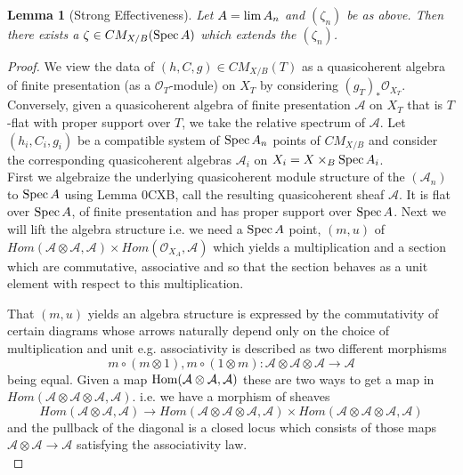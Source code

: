 \documentclass{stacks-project}
\theoremstyle{plain}
\newtheorem{lemma}[subsection]{Lemma}
\theoremstyle{definition}
\DeclareMathOperator{\Spec}{Spec}
\theoremstyle{remark}
\numberwithin{equation}{subsection}
\def\lim{\mathop{\rm lim}\nolimits}
\def\Spec{\mathop{\rm Spec}}
\def\Hom{\mathop{\rm Hom}\nolimits}
\begin{document}
\begin{lemma}[Strong Effectiveness] Let $A=\lim A_n$ and $(\zeta_n)$ be as above. Then there exists a $\zeta \in CM_{X/B}(\Spec A)$ which extends the $(\zeta_n)$. 
	\label{lemma-cm-strong-effectiveness}
\end{lemma}
\begin{proof}
We view the data of $(h,C, g) \in CM_{X/B}(T)$ as a quasicoherent algebra of finite presentation (as a $\mathcal{O}_T$-module) on $X_T$ by considering $(g_T)_*\mathcal{O}_{X_T}$. Conversely, given a quasicoherent algebra of finite presentation $\mathcal{A}$ on $X_T$ that is $T$-flat with proper support over $T$, we take the relative spectrum of $\mathcal{A}$. Let $(h_i,C_i,g_i)$ be a compatible system of $\Spec A_n$ points of $CM_{X/B}$ and consider the corresponding quasicoherent algebras $\mathcal{A}_i$ on $X_i=X \times_B  \Spec A_i$.
\\

First we algebraize the underlying quasicoherent module structure of the $(\mathcal{A}_n)$ to $\Spec A$ using Lemma 0CXB, call the resulting quasicoherent sheaf $\mathcal{A}$. It is flat over $\Spec A$, of finite presentation and has proper support over $\Spec A$. Next we will lift the algebra structure i.e. we need a $\Spec A$ point, $(m,u)$ of $Hom(\mathcal{A} \otimes \mathcal{A}, \mathcal{A}) \times Hom(\mathcal{O}_{X_A},\mathcal{A})$ which yields a multiplication and a section which are commutative, associative and so that the section behaves as a unit element with respect to this multiplication. 

That $(m,u)$ yields an algebra structure is expressed by the commutativity of certain diagrams whose arrows naturally depend only on the choice of multiplication and unit e.g. associativity is described as two different morphisms 
\[m \circ (m \otimes 1), m \circ (1 \otimes m): \mathcal{A} \otimes \mathcal{A} \otimes \mathcal{A} \to \mathcal{A}\]
being equal. Given a map $\Hom(\mathcal{A} \otimes \mathcal{A}, \mathcal{A})$ these are two ways to get a map in $Hom(\mathcal{A} \otimes \mathcal{A} \otimes \mathcal{A}, \mathcal{A})$. i.e. we have a morphism of sheaves
\[Hom(\mathcal{A} \otimes \mathcal{A}, \mathcal{A}) \to Hom(\mathcal{A} \otimes \mathcal{A} \otimes \mathcal{A}, \mathcal{A}) \times Hom(\mathcal{A} \otimes \mathcal{A} \otimes \mathcal{A}, \mathcal{A})\]
and the pullback of the diagonal is a closed locus which consists of those maps $\mathcal{A} \otimes \mathcal{A} \to \mathcal{A}$ satisfying the associativity law. 
\\


\end{proof}
\end{document}
